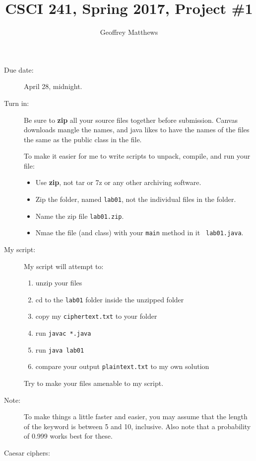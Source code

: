 \documentclass{article}
\title{CSCI 241, Spring 2017, Project \#1}
\author{Geoffrey Matthews}
\begin{document}
\maketitle



\begin{description}
\item[Due date:]  April 28, midnight.

\item[Turn in:] Be sure to {\bf zip} all your source files together
  before submission.  Canvas downloads mangle the names, and java
  likes to have the names of the files the same as the public class in
  the file.

  To make
  it easier for me to write scripts to unpack, compile, and run your
  file:
  \begin{itemize}
    \item
      Use {\bf zip}, not tar or 7z or any other archiving software.
    \item Zip the folder, named {\tt lab01},
      not the individual  files in the folder.
      \item Name the zip file {\tt lab01.zip}.
\item
  Nmae the file (and class) with your {\tt main} method in it {\tt
    lab01.java}. 
  \end{itemize}  
\item[My script:] My script will attempt to:
  \begin{enumerate}
  \item
    unzip your files
  \item
    cd to the {\tt lab01} folder inside the unzipped folder
  \item
    copy my {\tt ciphertext.txt} to your folder
  \item run {\tt javac *.java}
  \item run   {\tt java lab01}
  \item compare your output {\tt plaintext.txt} to my own solution
  \end{enumerate}
  Try to make your files amenable to my script.



\item[Note:] To make things a little faster and easier, you may assume
  that the length of the keyword is between 5 and 10, inclusive.
Also note that a probability of 0.999 works best for these.



\item[Caesar ciphers:]


\end{description}
\end{document}
